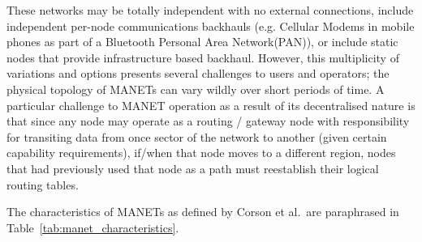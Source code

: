 These networks may be totally independent with no external connections, include independent per-node communications backhauls (e.g. Cellular Modems in mobile phones as part of a Bluetooth Personal Area Network(PAN)), or include static nodes that provide infrastructure based backhaul. 
However, this multiplicity of variations and options presents several challenges to users and operators; the physical topology of MANETs can vary wildly over short periods of time. 
A particular challenge to MANET operation as a result of its decentralised nature is that since any node may operate as a routing / gateway node with responsibility for transiting data from once sector of the network to another (given certain capability requirements), if/when that node moves to a different region, nodes that had previously used that node as a path must reestablish their logical routing tables. 

The characteristics of MANETs as defined by Corson et al.\ are paraphrased in Table~\ref{tab:manet_characteristics}.

